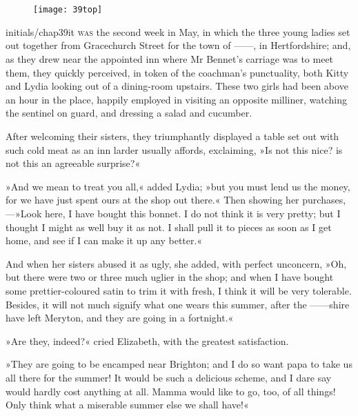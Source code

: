 \chapter[Chapter \thechapter]{}
	
\begin{figure}[t!]
\centering
\texttt{[image: 39top]}
\end{figure}


\lettrine[lines=6,image=true,findent=2pt]{initials/chap39it}{ was} the second week in May, in which the three young ladies set out together from Gracechurch Street for the town of ——, in Hertfordshire; and, as they drew near the appointed inn where Mr Bennet's carriage was to meet them, they quickly perceived, in token of the coachman's punctuality, both Kitty and Lydia looking out of a dining-room upstairs. These two girls had been above an hour in the place, happily employed in visiting an opposite milliner, watching the sentinel on guard, and dressing a salad and cucumber.

After welcoming their sisters, they triumphantly displayed a table set out with such cold meat as an inn larder usually affords, exclaiming, »Is not this nice? is not this an agreeable surprise?«

»And we mean to treat you all,« added Lydia; »but you must lend us the money, for we have just spent ours at the shop out there.« Then showing her purchases,—»Look here, I have bought this bonnet. I do not think it is very pretty; but I thought I might as well buy it as not. I shall pull it to pieces as soon as I get home, and see if I can make it up any better.«

And when her sisters abused it as ugly, she added, with perfect unconcern, »Oh, but there were two or three much uglier in the shop; and when I have bought some prettier-coloured satin to trim it with fresh, I think it will be very tolerable. Besides, it will not much signify what one wears this summer, after the ——shire have left Meryton, and they are going in a fortnight.«

»Are they, indeed?« cried Elizabeth, with the greatest satisfaction.

»They are going to be encamped near Brighton; and I do so want papa to take us all there for the summer! It would be such a delicious scheme, and I dare say would hardly cost anything at all. Mamma would like to go, too, of all things! Only think what a miserable summer else we shall have!«

